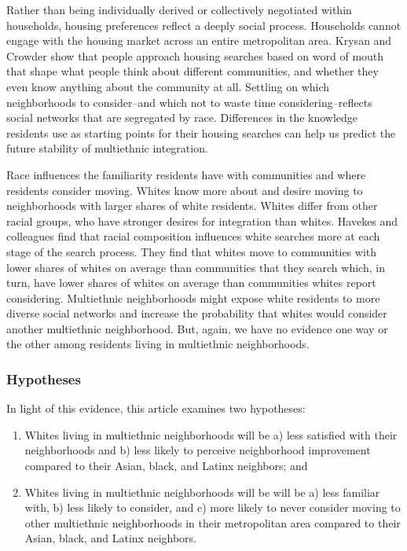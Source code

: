 \documentclass{baderart}
\providecommand{\tightlist}{%
  \setlength{\itemsep}{0pt}\setlength{\parskip}{0pt}}
\begin{document}
Rather than being individually derived or collectively negotiated within households, housing preferences reflect a deeply social process. Households cannot engage with the housing market across an entire metropolitan area. Krysan and Crowder show that people approach housing searches based on word of mouth that shape what people think about different communities, and whether they even know anything about the community at all. Settling on which neighborhoods to consider--and which not to waste time considering--reflects social networks that are segregated by race. Differences in the knowledge residents use as starting points for their housing searches can help us predict the future stability of multiethnic integration.

Race influences the familiarity residents have with communities and where residents consider moving. Whites know more about and desire moving to neighborhoods with larger shares of white residents. Whites differ from other racial groups, who have stronger desires for integration than whites. Havekes and colleagues find that racial composition influences white searches more at each stage of the search process. They find that whites move to communities with lower shares of whites on average than communities that they search which, in turn, have lower shares of whites on average than communities whites report considering. Multiethnic neighborhoods might expose white residents to more diverse social networks and increase the probability that whites would consider another multiethnic neighborhood. But, again, we have no evidence one way or the other among residents living in multiethnic neighborhoods.

\subsubsection{Hypotheses}\label{hypotheses}

In light of this evidence, this article examines two hypotheses:


\begin{enumerate} \def\labelenumi{\arabic{enumi}.} \tightlist \item   Whites living in multiethnic neighborhoods will be a) less satisfied   with their neighborhoods and b) less likely to perceive neighborhood   improvement compared to their Asian, black, and Latinx neighbors; and \item   Whites living in multiethnic neighborhoods will be will be a) less   familiar with, b) less likely to consider, and c) more likely to never   consider moving to other multiethnic neighborhoods in their   metropolitan area compared to their Asian, black, and Latinx   neighbors. \end{enumerate}
\end{document}
